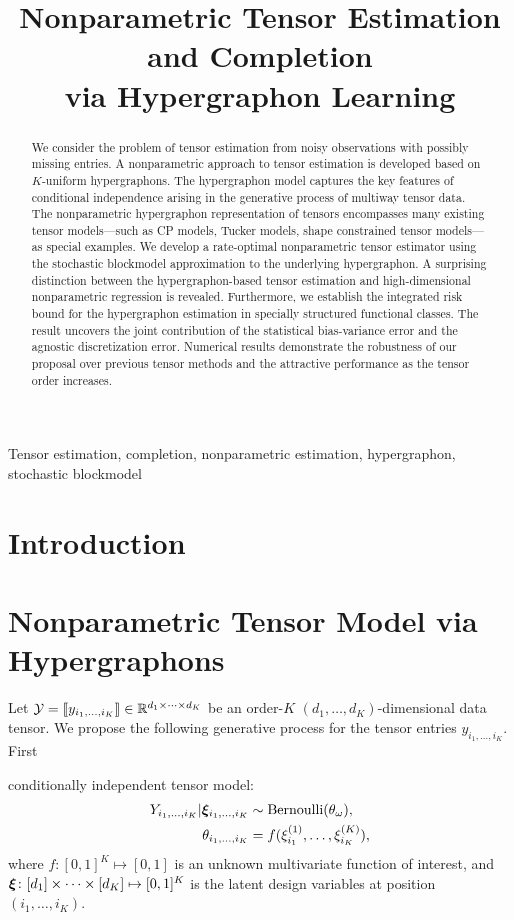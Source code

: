 \documentclass[final,12pt]{colt2020} %
\title[Short Title]{Nonparametric Tensor Estimation and Completion \\ via Hypergraphon Learning}
\begin{document}
\maketitle

\begin{abstract}%
We consider the problem of tensor estimation from noisy observations with possibly missing entries. A nonparametric approach to tensor estimation is developed based on $K$-uniform hypergraphons. The hypergraphon model captures the key features of conditional independence arising in the generative process of multiway tensor data. The nonparametric hypergraphon representation of tensors encompasses many existing tensor models---such as CP models, Tucker models, shape constrained tensor models---as special examples. We develop a rate-optimal nonparametric tensor estimator using the stochastic blockmodel approximation to the underlying hypergraphon. A surprising distinction between the hypergraphon-based tensor estimation and high-dimensional nonparametric regression is revealed. Furthermore, we establish the integrated risk bound for the hypergraphon estimation in specially structured functional classes. The result uncovers the joint contribution of the statistical bias-variance error and the agnostic discretization error. Numerical results demonstrate the robustness of our proposal over previous tensor methods and the attractive performance as the tensor order increases.\\
\end{abstract}

\begin{keywords}
Tensor estimation, completion, nonparametric estimation, hypergraphon, stochastic blockmodel
\end{keywords}


\section{Introduction}
\section{Nonparametric Tensor Model via Hypergraphons}
Let $\mathcal{Y}=\llbracket y_{i_1,\ldots,i_K} \rrbracket\in\mathbb{R}^{d_1\times \cdots \times d_K}$ be an order-$K$ $(d_1,\ldots,d_K)$-dimensional data tensor. We propose the following generative process for the tensor entries $y_{i_1,\ldots,i_K}$. First 


conditionally independent tensor model:
\begin{align}
Y_{i_1,\ldots,i_K} |\boldsymbol{\xi}_{i_1,\ldots,i_K} &\sim \text{Bernoulli}(\theta_\omega),\\
\theta_{i_1,\ldots,i_K} &=f(\xi^{(1)}_{i_1},\ldots,\xi^{(K)}_{i_K}),
\end{align}
where $f\colon [0,1]^K\mapsto [0,1]$ is an unknown multivariate function of interest, and $\boldsymbol{\xi} \colon [d_1]\times \cdots \times [d_K] \mapsto [0,1]^K$ is the latent design variables at position $(i_1,\ldots,i_K)$. 
\end{document}
